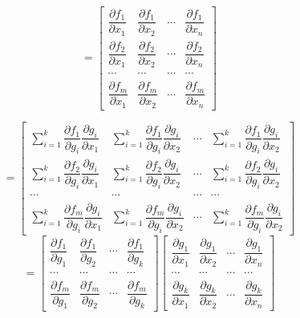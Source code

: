 \documentclass{article}
\begin{document}
\[
=\begin{bmatrix}
 \dfrac{\partial f_1}{\partial x_1} & \dfrac{\partial f_1}{\partial x_2} & \cdots & \dfrac{\partial f_1}{\partial x_n} \\ 
 \dfrac{\partial f_2}{\partial x_1} & \dfrac{\partial f_2}{\partial x_2} & \cdots & \dfrac{\partial f_2}{\partial x_n} \\ 
 \cdots & \cdots & \cdots & \cdots \\ 
 \dfrac{\partial f_m}{\partial x_1} & \dfrac{\partial f_m}{\partial x_2} & \cdots & \dfrac{\partial f_m}{\partial x_n}
\end{bmatrix}
\]

\[
=\begin{bmatrix}
 \sum_{i=1}^k \dfrac{\partial f_1}{\partial g_i} \dfrac{\partial g_i}{\partial x_1} & \sum_{i=1}^k \dfrac{\partial f_1}{\partial g_i} \dfrac{\partial g_i}{\partial x_2} & \cdots & \sum_{i=1}^k \dfrac{\partial f_1}{\partial g_i} \dfrac{\partial g_i}{\partial x_2} \\ 
 \sum_{i=1}^k \dfrac{\partial f_2}{\partial g_i} \dfrac{\partial g_i}{\partial x_1} & \sum_{i=1}^k \dfrac{\partial f_2}{\partial g_i} \dfrac{\partial g_i}{\partial x_2} & \cdots & \sum_{i=1}^k \dfrac{\partial f_2}{\partial g_i} \dfrac{\partial g_i}{\partial x_2} \\ 
 \cdots & \cdots & \cdots & \cdots \\ 
 \sum_{i=1}^k \dfrac{\partial f_m}{\partial g_i} \dfrac{\partial g_i}{\partial x_1} & \sum_{i=1}^k \dfrac{\partial f_m}{\partial g_i} \dfrac{\partial g_i}{\partial x_2} & \cdots & \sum_{i=1}^k \dfrac{\partial f_m}{\partial g_i} \dfrac{\partial g_i}{\partial x_2}
\end{bmatrix}
\]
\[
=\begin{bmatrix}
 \dfrac{\partial f_1}{\partial g_1} & \dfrac{\partial f_1}{\partial g_2} & \cdots & \dfrac{\partial f_1}{\partial g_k} \\ 
 \cdots & \cdots & \cdots & \cdots \\ 
 \dfrac{\partial f_m}{\partial g_1} & \dfrac{\partial f_m}{\partial g_2} & \cdots & \dfrac{\partial f_m}{\partial g_k}
\end{bmatrix}
\begin{bmatrix}
 \dfrac{\partial g_1}{\partial x_1} & \dfrac{\partial g_1}{\partial x_2} & \cdots & \dfrac{\partial g_1}{\partial x_n} \\ 
 \cdots & \cdots & \cdots & \cdots \\ 
 \dfrac{\partial g_k}{\partial x_1} & \dfrac{\partial g_k}{\partial x_2} & \cdots & \dfrac{\partial g_k}{\partial x_n}
\end{bmatrix}
\]
\end{document}
